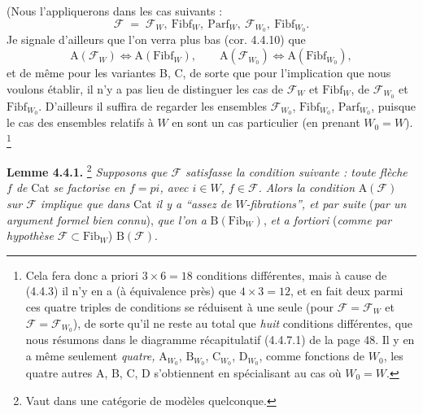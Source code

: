 \documentclass[11pt]{article}
\newcommand{\printedpage}[1]{\marginpar{\footnotesize p.~#1}}
\newcommand{\msp}[1]{\marginpar{\footnotesize [#1]}}
\newcommand{\Fib}{\mathrm{Fib}}
\newcommand{\Fibf}{\mathrm{Fibf}}
\newcommand{\Parf}{\mathrm{Parf}}
\newcommand{\cF}{\mathcal{F}}
\begin{document}
\msp{page 41}

(Nous l'appliquerons dans les cas suivants : %
\[
\cF \;=\; \cF_W,\ \Fibf_W,\ \Parf_W,\ \cF_{W_0},\ \Fibf_{W_0}.
\tag*{(4.4.2)}
\]
Je signale d'ailleurs que l'on verra plus bas (cor. 4.4.10) que
\[
\mathrm{A}(\cF_W) \iff \mathrm{A}(\Fibf_W), \qquad \mathrm{A}(\cF_{W_0}) \iff \mathrm{A}(\Fibf_{W_0}),
\tag*{(4.4.3)}
\]
et de même pour les variantes B, C, de sorte que pour l'implication que nous voulons établir, il n'y a pas lieu de distinguer les cas de $\cF_W$ et $\Fibf_W$, de $\cF_{W_0}$ et $\Fibf_{W_0}$. D'ailleurs il suffira de regarder les ensembles $\cF_{W_0}$, $\Fibf_{W_0}$, $\Parf_{W_0}$, puisque le cas des ensembles relatifs à $W$ en sont un cas particulier (en prenant $W_0 = W$). \footnote[28]{Cela fera donc a priori $3 \times 6 = 18$ conditions différentes, mais à cause de (4.4.3) il n'y en a (à équivalence près) que $4 \times 3 = 12$, et en fait deux parmi ces quatre triples de conditions se réduisent à une seule (pour $\cF = \cF_W$ et $\cF = \cF_{W_0}$), de sorte qu'il ne reste au total que \textit{huit} conditions différentes, que nous résumons dans le diagramme récapitulatif (4.4.7.1) de la page 48. Il y en a même seulement \textit{quatre,} $\mathrm{A}_{W_0}$, $\mathrm{B}_{W_0}$, $\mathrm{C}_{W_0}$, $\mathrm{D}_{W_0}$, comme fonctions de $W_0$, les quatre autres A, B, C, D s'obtiennent en spécialisant au cas où $W_0 = W$.}

\printedpage{25}

\textbf{Lemme 4.4.1.} \footnote[29]{Vaut dans une catégorie de modèles quelconque.} \textit{Supposons que $\cF$ satisfasse la condition suivante : toute flèche $f$ de} Cat \textit{se factorise en $f = pi$, avec $i \in W$, $f \in \cF$. Alors la condition} $\mathrm{A}(\cF)$ \textit{sur $\cF$ implique que dans} Cat \textit{il y a “assez de $W$-fibrations”, et par suite} (\textit{par un argument formel bien} %
\msp{page 42}
\textit{connu}), \textit{que l'on a} $\mathrm{B}(\Fib_W)$, \textit{et a fortiori} (\textit{comme par hypothèse} $\cF \subset \Fib_W$) $\mathrm{B}(\cF)$.
\end{document}
